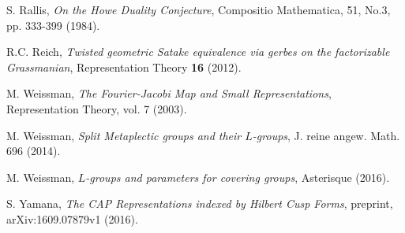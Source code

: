 \documentclass[11pt,reqno]{amsart}
\theoremstyle{definition}
\theoremstyle{remark}
\theoremstyle{definition}
\begin{document}
\begin{thebibliography}{99}
 S. Rallis,  \emph{On the Howe Duality Conjecture}, Compositio Mathematica, 51, No.3, pp. 333-399 (1984).

 R.C. Reich, \emph{Twisted geometric Satake equivalence via gerbes on the factorizable Grassmanian}, Representation Theory {\bf 16} (2012).

 M. Weissman, \emph{The Fourier-Jacobi Map and Small Representations}, Representation Theory, vol. 7 (2003).

 M. Weissman, \emph{Split Metaplectic groups and their $L$-groups}, J. reine angew. Math. 696 (2014).

 M. Weissman, \emph{$L$-groups and parameters for covering groups}, Asterisque (2016).
 
 S. Yamana,  \emph{The CAP Representations indexed by Hilbert Cusp Forms}, preprint, arXiv:1609.07879v1 (2016).
\end{thebibliography}
\end{document}
